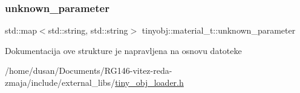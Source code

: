 \mbox{\label{structtinyobj_1_1material__t_a18b700227c94d410ed1aa550c7fa9226}} 
\subsubsection{\texorpdfstring{unknown\+\_\+parameter}{unknown\_parameter}}
{\footnotesize\ttfamily std\+::map$<$std\+::string, std\+::string$>$ tinyobj\+::material\+\_\+t\+::unknown\+\_\+parameter}



Dokumentacija ove strukture je napravljena na osnovu datoteke \begin{DoxyCompactItemize}
\item 
/home/dusan/\+Documents/\+R\+G146-\/vitez-\/reda-\/zmaja/include/external\+\_\+libs/\hyperlink{tiny__obj__loader_8h}{tiny\+\_\+obj\+\_\+loader.\+h}\end{DoxyCompactItemize}
